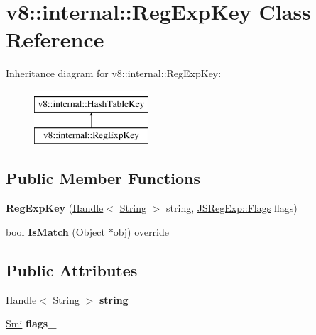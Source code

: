 \hypertarget{classv8_1_1internal_1_1RegExpKey}{}\section{v8\+:\+:internal\+:\+:Reg\+Exp\+Key Class Reference}
\label{classv8_1_1internal_1_1RegExpKey}
Inheritance diagram for v8\+:\+:internal\+:\+:Reg\+Exp\+Key\+:\begin{figure}[H]
\begin{center}
\leavevmode
\includegraphics[height=2.000000cm]{classv8_1_1internal_1_1RegExpKey}
\end{center}
\end{figure}
\subsection*{Public Member Functions}
\begin{DoxyCompactItemize}
\item 
\mbox{\label{classv8_1_1internal_1_1RegExpKey_a246a71b4ad1895699c71d654d56083b3}} 
{\bfseries Reg\+Exp\+Key} (\mbox{\hyperlink{classv8_1_1internal_1_1Handle}{Handle}}$<$ \mbox{\hyperlink{classv8_1_1internal_1_1String}{String}} $>$ string, \mbox{\hyperlink{classv8_1_1base_1_1Flags}{J\+S\+Reg\+Exp\+::\+Flags}} flags)
\item 
\mbox{\label{classv8_1_1internal_1_1RegExpKey_ad1255b383684119037cff47aa028d6fb}} 
\mbox{\hyperlink{classbool}{bool}} {\bfseries Is\+Match} (\mbox{\hyperlink{classv8_1_1internal_1_1Object}{Object}} $\ast$obj) override
\end{DoxyCompactItemize}
\subsection*{Public Attributes}
\begin{DoxyCompactItemize}
\item 
\mbox{\label{classv8_1_1internal_1_1RegExpKey_ae4407fa7b5a7816859b04ba2bb07930a}} 
\mbox{\hyperlink{classv8_1_1internal_1_1Handle}{Handle}}$<$ \mbox{\hyperlink{classv8_1_1internal_1_1String}{String}} $>$ {\bfseries string\+\_\+}
\item 
\mbox{\label{classv8_1_1internal_1_1RegExpKey_a97987076b844d87f116fdce5b6aa784b}} 
\mbox{\hyperlink{classv8_1_1internal_1_1Smi}{Smi}} {\bfseries flags\+\_\+}
\end{DoxyCompactItemize}
